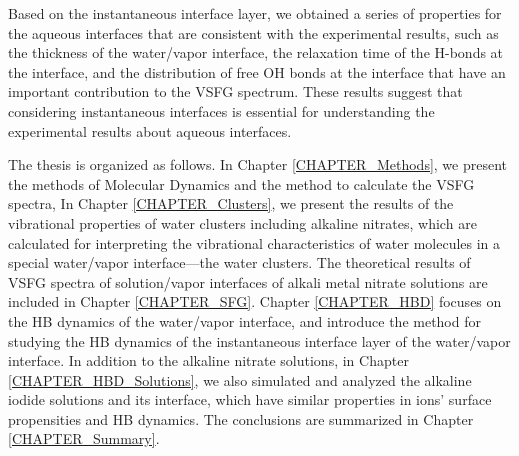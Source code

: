 
Based on the instantaneous interface layer, we obtained a series of properties for the aqueous interfaces that are consistent with the experimental results, 
such as the thickness of the water/vapor interface, the relaxation time of the H-bonds at the interface, 
and the distribution of free OH bonds at the interface that have an important contribution to the VSFG spectrum.
These results suggest that considering instantaneous interfaces is essential for understanding the experimental results about aqueous interfaces.
%

The thesis is organized as follows. 
In Chapter \ref{CHAPTER_Methods}, we present the methods of \abinitio Molecular Dynamics
and the method to calculate the VSFG spectra,
In Chapter \ref{CHAPTER_Clusters}, we present the results of the vibrational properties of water clusters including alkaline nitrates, 
which are calculated for interpreting the vibrational characteristics of water molecules in a special water/vapor interface---the water clusters.
The theoretical results of VSFG spectra of solution/vapor interfaces of alkali metal nitrate solutions are included in Chapter \ref{CHAPTER_SFG}. 
Chapter \ref{CHAPTER_HBD} focuses on the HB dynamics of the water/vapor interface, 
and introduce the method for studying the HB dynamics of the instantaneous interface layer of the water/vapor interface.
In addition to the alkaline nitrate solutions, in Chapter \ref{CHAPTER_HBD_Solutions}, we also simulated and analyzed the alkaline iodide solutions and its interface, which have similar properties in ions' surface propensities and HB dynamics. 
The conclusions are summarized in Chapter \ref{CHAPTER_Summary}.
